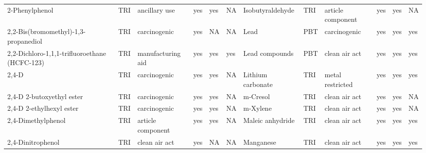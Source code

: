 \begin{table}[H]
{\begin{tabular}{llllllllllll}
            2-Phenylphenol                                                             & TRI            & ancillary use         & yes    & yes     & NA   & Isobutyraldehyde                                                                                                   & TRI            & article component & yes & yes & NA\\
            2,2-Bis(bromomethyl)-1,3-propanediol                                       & TRI            & carcinogenic          & yes    & NA      & NA   & Lead                                                                                                               & PBT            & carcinogenic & yes & yes & yes\\
            2,2-Dichloro-1,1,1-trifluoroethane (HCFC-123)                              & TRI            & manufacturing aid     & yes    & yes     & yes  & Lead compounds & PBT & clean air act & yes & yes & yes\\
            2,4-D                                                                      & TRI            & carcinogenic          & yes    & yes     & NA   & Lithium carbonate                                                                                                  & TRI            & metal restricted      & yes    & yes & yes\\
            2,4-D 2-butoxyethyl ester                                                  & TRI            & carcinogenic          & yes    & yes     & NA   & m-Cresol                                                                                                           & TRI            & clean air act & yes & yes & NA\\
            2,4-D 2-ethylhexyl ester                                                   & TRI            & carcinogenic          & yes    & yes     & NA   & m-Xylene                                                                                                           & TRI            & clean air act         & yes & yes & NA\\
            2,4-Dimethylphenol                                                         & TRI            & article component     & yes    & yes     & NA   & Maleic anhydride                                                                                                   & TRI            & clean air act & yes & yes & yes\\
            2,4-Dinitrophenol                                                          & TRI            & clean air act         & yes    & NA      & NA   & Manganese                                                                                                          & TRI            & clean air act         & yes    & yes & yes\\

\end{tabular}}
\end{table}
